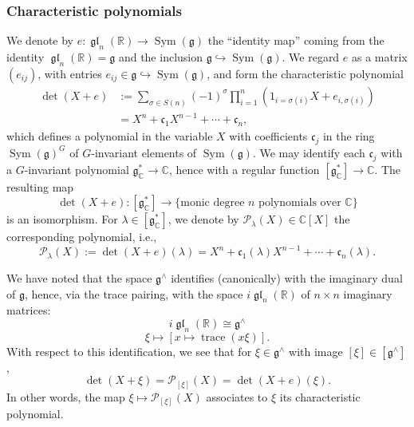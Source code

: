 \documentclass[reqno]{amsart}
\DeclareMathOperator{\glLie}{\mathfrak{g}\mathfrak{l}}
\DeclareMathOperator{\trace}{trace}
\DeclareMathOperator{\Sym}{Sym}
\theoremstyle{plain} \newtheorem{theorem} {Theorem}
\theoremstyle{definition} \newtheorem{definition} [theorem] {Definition}
\theoremstyle{itplain} %
\numberwithin{equation}{section}
\numberwithin{theorem}{section}
\begin{document}
\subsubsection{Characteristic polynomials}\label{sec:char-polyn}
We denote by $e : \glLie_n(\mathbb{R}) \rightarrow \Sym(\mathfrak{g})$ the ``identity map'' coming from the identity $\glLie_n(\mathbb{R}) = \mathfrak{g}$ and the inclusion $\mathfrak{g} \hookrightarrow \Sym(\mathfrak{g})$.  We regard $e$ as a matrix $(e_{i j})$, with entries $e_{i j} \in \mathfrak{g} \hookrightarrow \Sym(\mathfrak{g})$, and form the characteristic polynomial
\begin{align}\label{eq:detx-+-e}
  \det(X + e)
  &:=
    \sum _{\sigma \in S(n)}
    (-1)^\sigma
    \prod_{i=1}^n
    (1_{i=\sigma(i)} X
    + e_{i,\sigma(i)})
  \\ \nonumber
  &=
    X^n +
    \mathfrak{c}_1 X^{n-1}
    + \dotsb + \mathfrak{c}_n,
\end{align}
which defines a polynomial in the variable $X$ with coefficients $\mathfrak{c}_j$ in the ring $\Sym(\mathfrak{g})^G$ of $G$-invariant elements of $\Sym(\mathfrak{g})$.  We may identify each $\mathfrak{c}_j$ with a $G$-invariant polynomial $\mathfrak{g}_\mathbb{C}^* \rightarrow \mathbb{C}$, hence with a regular function $[\mathfrak{g}_\mathbb{C}^*] \rightarrow \mathbb{C}$.  The resulting map
\[
  \det(X + e) : [\mathfrak{g}_\mathbb{C}^*] \rightarrow \{ \text{monic degree $n$ polynomials over $\mathbb{C}$} \}
\]
is an isomorphism.  For $\lambda \in [\mathfrak{g}_{\mathbb{C}}^*]$, we denote by $\mathcal{P}_\lambda(X) \in \mathbb{C}[X]$ the corresponding polynomial, i.e., 
\begin{equation}\label{eq:polynomial-P-lambda}
  \mathcal{P}_\lambda(X) := \det(X+e)(\lambda) = X^n + \mathfrak{c}_1(\lambda) X^{n-1} + \dotsb + \mathfrak{c}_n(\lambda).
\end{equation}

We have noted that the space $\mathfrak{g}^\wedge$ identifies (canonically) with the imaginary dual of $\mathfrak{g}$,  hence, via the trace pairing, with the space $i \glLie_n(\mathbb{R})$ of $n \times n$ imaginary matrices:
\[
  i \glLie_n(\mathbb{R}) \cong \mathfrak{g}^\wedge
\]
\[
  \xi \mapsto [x \mapsto \trace(x \xi)].
\]
With respect to this identification, we see that for $\xi \in \mathfrak{g}^\wedge$ with image $[\xi] \in [\mathfrak{g}^\wedge]$,
\[
  \det(X + \xi) = \mathcal{P}_{[\xi]}(X) = \det(X + e)(\xi).
\]
In other words, the map $\xi \mapsto \mathcal{P}_{[\xi]}(X)$ associates to $\xi$ its characteristic polynomial.
\end{document}
